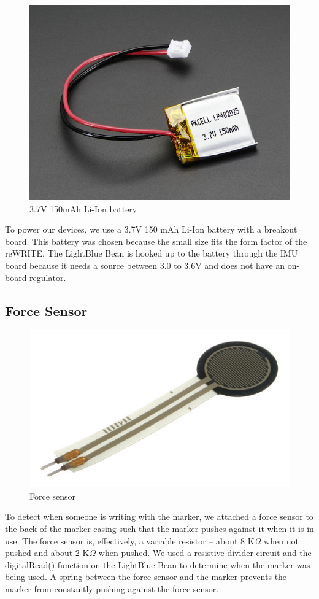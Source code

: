 \documentclass[12pt,journal]{IEEEtran}
\begin{document}
\begin{figure}[H]
    \includegraphics[width=0.6\linewidth]{figures/battery}
  \caption{3.7V 150mAh Li-Ion battery}
  \label{fig:battery}
\end{figure}
  To power our devices, we use a 3.7V 150 mAh Li-Ion battery with a breakout board. This battery was chosen because the small size fits the form factor of the reWRITE. The LightBlue Bean is hooked up to the battery through the IMU board because it needs a source between 3.0 to 3.6V and does not have an on-board regulator.

\subsection{Force Sensor}

\begin{figure}[H]
    \includegraphics[width=0.6\linewidth]{figures/force-sensor}
  \caption{Force sensor}
  \label{fig:system}
\end{figure}
  To detect when someone is writing with the marker, we attached a force sensor to the back of the marker casing such that the marker pushes against it when it is in use. The force sensor is, effectively, a variable resistor -- about 8 K$\Omega$ when not pushed and about 2 K$\Omega$ when pushed. We used a resistive divider circuit and the digitalRead() function on the LightBlue Bean to determine when the marker was being used. A spring between the force sensor and the marker prevents the marker from constantly pushing against the force sensor.
\end{document}
